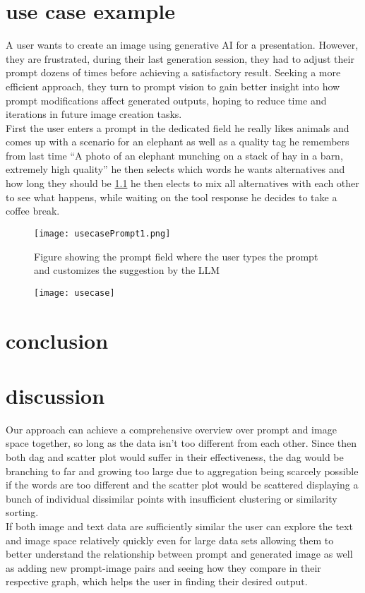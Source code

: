 \documentclass[
  a4paper,  %
  twoside,  %
  bibliography=totoc,
  headsepline,
  cleardoublepage=empty,
  parskip=half,
  draft=false
]{scrbook}
\begin{document}
\chapter{use case example}
A user wants to create an image using generative AI for a presentation. However, they are frustrated, during their last generation session, they had to adjust their prompt dozens of times before achieving a satisfactory result. Seeking a more efficient approach, they turn to prompt vision to gain better insight into how prompt modifications affect generated outputs, hoping to reduce time and iterations in future image creation tasks.\\
First the user enters a prompt in the dedicated field he really likes animals and comes up with a scenario for an elephant as well as a quality tag he remembers from last time \enquote{A photo of an elephant munching on a stack of hay in a barn, extremely high quality} he then selects which words he wants alternatives and how long they should be \cref{fig:usecasePrompt1} he then elects to mix all alternatives with each other to see what happens, while waiting on the tool response he decides to take a coffee break.
\begin{figure}[H]
	\centering
	\texttt{[image: usecasePrompt1.png]}
	\caption{Figure showing the prompt field where the user types the prompt and customizes the suggestion by the LLM}
	\label{fig:usecasePrompt1}
\end{figure}
\begin{figure}[H]
	\centering
	\texttt{[image: usecase]}
\end{figure}

\chapter{conclusion}
\chapter{discussion}
\label{chap:zusfas}
Our approach can achieve a comprehensive overview over prompt and image space together, so long as the data isn't too different from each other. Since then both dag and scatter plot would suffer in their effectiveness, the dag would be branching to far and growing too large due to aggregation being scarcely possible if the words are too different and the scatter plot would be scattered displaying a bunch of individual dissimilar points with insufficient clustering or similarity sorting.\\ If both image and text data are sufficiently similar the user can explore the text and image space relatively quickly even for large data sets allowing them to better understand the relationship between prompt and generated image as well as adding new prompt-image pairs and seeing how they compare in their respective graph, which helps the user in finding their desired output.
\end{document}
